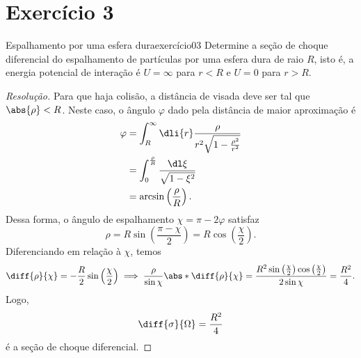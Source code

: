 \section*{Exercício 3}
\begin{exercício}{Espalhamento por uma esfera dura}{exercício03}
    Determine a seção de choque diferencial do espalhamento de partículas por uma esfera dura de raio \(R\), isto é, a energia potencial de interação é \(U = \infty\) para \(r < R\) e \(U = 0\) para \(r > R\).
\end{exercício}
\begin{proof}[Resolução]
    Para que haja colisão, a distância de visada deve ser tal que \(\abs{\rho} < R\). Neste caso, o ângulo \(\varphi\) dado pela distância de maior aproximação é
    \begin{align*}
        \varphi &= \int_{R}^\infty \dli{r} \frac{\rho}{r^2\sqrt{1 - \frac{\rho^2}{r^2}}}\\
                &= \int_{0}^{\frac{\rho}{R}}\frac{\dl\xi}{\sqrt{1 - \xi^2}}\\
                &= \arcsin\left(\frac{\rho}{R}\right).
    \end{align*}
    Dessa forma, o ângulo de espalhamento \(\chi = \pi - 2 \varphi\) satisfaz
    \begin{equation*}
        \rho = R \sin\left(\frac{\pi - \chi}{2}\right) = R \cos\left(\frac\chi2\right).
    \end{equation*}
    Diferenciando em relação à \(\chi\), temos
    \begin{equation*}
        \diff{\rho}{\chi} = -\frac{R}{2} \sin\left(\frac\chi 2\right) \implies \frac{\rho}{\sin\chi}\abs*{\diff{\rho}{\chi}} = \frac{R^2\sin\left(\frac\chi2\right)\cos\left(\frac\chi2\right)}{2\sin\chi} = \frac{R^2}{4}.
    \end{equation*}
    Logo,
    \begin{equation*}
        \diff{\sigma}{\Omega} = \frac{R^2}{4}
    \end{equation*}
    é a seção de choque diferencial.
\end{proof}
